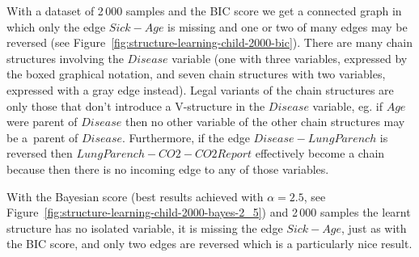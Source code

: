 \documentclass[english,cover]{fitthesis} %
\begin{document}
With a dataset of 2\,000 samples and the BIC score we get a connected graph in which only the edge $Sick - Age$ is missing and one or two of many edges may be reversed (see Figure~\ref{fig:structure-learning-child-2000-bic}). There are many chain structures involving the $Disease$ variable (one with three variables, expressed by the boxed graphical notation, and seven chain structures with two variables, expressed with a gray edge instead). Legal variants of the chain structures are only those that don't introduce a V-structure in the $Disease$ variable, eg. if $Age$ were parent of $Disease$ then no other variable of the other chain structures may be a~parent of $Disease$. Furthermore, if the edge $Disease - LungParench$ is reversed then $LungParench - CO2 - CO2Report$ effectively become a chain because then there is no incoming edge to any of those variables.

With the Bayesian score (best results achieved with $\alpha=2.5$, see Figure~\ref{fig:structure-learning-child-2000-bayes-2_5}) and 2\,000 samples the learnt structure has no isolated variable, it is missing the edge $Sick - Age$, just as with the BIC score, and only two edges are reversed which is a particularly nice result.
\end{document}
